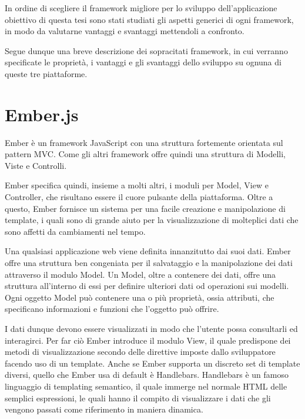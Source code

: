 In ordine di scegliere il framework migliore per lo sviluppo dell'applicazione obiettivo di questa tesi sono stati studiati gli aspetti generici di ogni framework, in modo da valutarne vantaggi e svantaggi mettendoli a confronto.

\vspace{1cm}
Segue dunque una breve descrizione dei sopracitati framework, in cui verranno specificate le proprietà, i vantaggi e gli svantaggi dello sviluppo su ognuna di queste tre piattaforme.

\newpage

\section{Ember.js} %
\label{sec:ember_js}

Ember è un framework JavaScript con una struttura fortemente orientata sul pattern MVC. Come gli altri framework offre quindi una struttura di Modelli, Viste e Controlli.

Ember specifica quindi, insieme a molti altri, i moduli per Model, View e Controller, che risultano essere il cuore pulsante della piattaforma.
Oltre a questo, Ember fornisce un sistema per una facile creazione e manipolazione di template, i quali sono di grande aiuto per la visualizzazione di molteplici dati che sono affetti da cambiamenti nel tempo.

Una qualsiasi applicazione web viene definita innanzitutto dai suoi dati. Ember offre una struttura ben congeniata per il salvataggio e la manipolazione dei dati attraverso il modulo Model. Un Model, oltre a contenere dei dati, offre una struttura all'interno di essi per definire ulteriori dati od operazioni sui modelli. Ogni oggetto Model può contenere una o più proprietà, ossia attributi, che specificano informazioni e funzioni che l'oggetto può offrire.

I dati dunque devono essere visualizzati in modo che l'utente possa consultarli ed interagirci. Per far ciò Ember introduce il modulo View, il quale predispone dei metodi di visualizzazione secondo delle direttive imposte dallo sviluppatore facendo uso di un template. Anche se Ember supporta un discreto set di template diversi, quello che Ember usa di default è Handlebars. Handlebars è un famoso linguaggio di templating semantico, il quale immerge nel normale HTML delle semplici espressioni, le quali hanno il compito di visualizzare i dati che gli vengono passati come riferimento in maniera dinamica.

